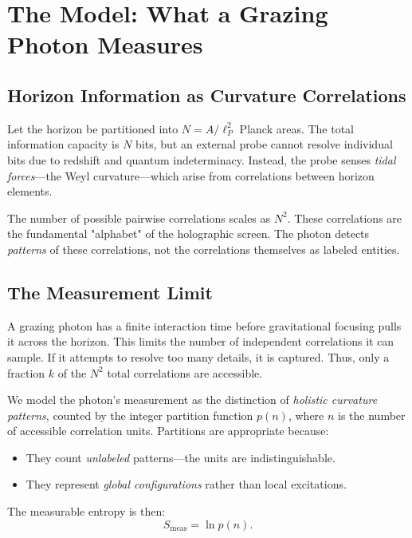 \documentclass[12pt, letterpaper]{article}
\begin{document}
\section{The Model: What a Grazing Photon Measures}

\subsection{Horizon Information as Curvature Correlations}

Let the horizon be partitioned into $N = A/\ell_P^2$ Planck areas. The total information capacity is $N$ bits, but an external probe cannot resolve individual bits due to redshift and quantum indeterminacy. Instead, the probe senses \emph{tidal forces}—the Weyl curvature—which arise from correlations between horizon elements.

The number of possible pairwise correlations scales as $N^2$. These correlations are the fundamental "alphabet" of the holographic screen. The photon detects \emph{patterns} of these correlations, not the correlations themselves as labeled entities.

\subsection{The Measurement Limit}

A grazing photon has a finite interaction time before gravitational focusing pulls it across the horizon. This limits the number of independent correlations it can sample. If it attempts to resolve too many details, it is captured. Thus, only a fraction $k$ of the $N^2$ total correlations are accessible.

We model the photon's measurement as the distinction of \emph{holistic curvature patterns}, counted by the integer partition function $p(n)$, where $n$ is the number of accessible correlation units. Partitions are appropriate because:
\begin{itemize}
\item They count \emph{unlabeled} patterns—the units are indistinguishable.
\item They represent \emph{global configurations} rather than local excitations.
\end{itemize}

The measurable entropy is then:
\begin{equation}
S_{\mathrm{meas}} = \ln p(n).
\label{eq:meas-entropy}
\end{equation}
\end{document}
